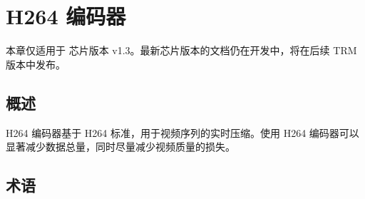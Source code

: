 \documentclass[main\_\_CN.tex]{subfiles}
\begin{document}

\ifglobal
\else
    {\let\clearpage\relax \listoftodos}
    {\let\clearpage\relax \listofdonetodos}
    \tableofcontents
\fi



\hypertarget{h264enc}{}
\chapter{H264 编码器}\label{mod:h264enc}

\begin{tiplisting}
本章仅适用于 \chipname{} 芯片版本 v1.3。最新芯片版本的文档仍在开发中，将在后续 TRM 版本中发布。
\end{tiplisting}

\section{概述}

H264 编码器基于 H264 标准，用于视频序列的实时压缩。使用 H264 编码器可以显著减少数据总量，同时尽量减少视频质量的损失。



\section{术语}
\end{document}
